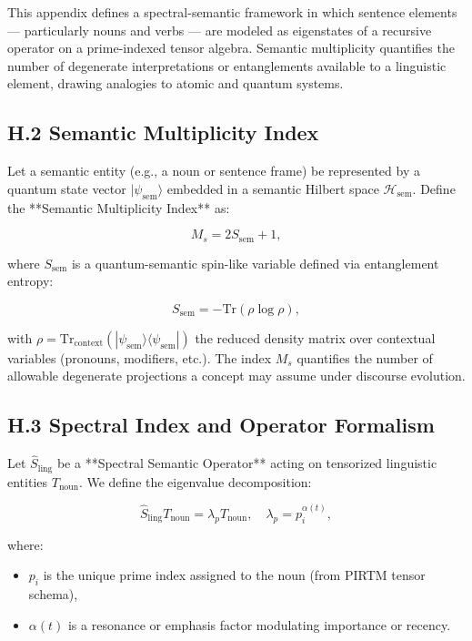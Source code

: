 \documentclass[12pt]{article}
\begin{document}
\begin{itemize}
This appendix defines a spectral-semantic framework in which sentence elements — particularly nouns and verbs — are modeled as eigenstates of a recursive operator on a prime-indexed tensor algebra. Semantic multiplicity quantifies the number of degenerate interpretations or entanglements available to a linguistic element, drawing analogies to atomic and quantum systems.

\subsection*{H.2 Semantic Multiplicity Index}

Let a semantic entity (e.g., a noun or sentence frame) be represented by a quantum state vector \( |\psi_{\text{sem}}\rangle \) embedded in a semantic Hilbert space \( \mathcal{H}_{\text{sem}} \). Define the **Semantic Multiplicity Index** as:

\[
M_s = 2S_{\text{sem}} + 1,
\]

where \( S_{\text{sem}} \) is a quantum-semantic spin-like variable defined via entanglement entropy:

\[
S_{\text{sem}} = -\text{Tr}(\rho \log \rho),
\]

with \( \rho = \text{Tr}_{\text{context}}(|\psi_{\text{sem}}\rangle \langle \psi_{\text{sem}}|) \) the reduced density matrix over contextual variables (pronouns, modifiers, etc.). The index \( M_s \) quantifies the number of allowable degenerate projections a concept may assume under discourse evolution.

\subsection*{H.3 Spectral Index and Operator Formalism}

Let \( \hat{S}_{\text{ling}} \) be a **Spectral Semantic Operator** acting on tensorized linguistic entities \( T_{\text{noun}} \). We define the eigenvalue decomposition:

\[
\hat{S}_{\text{ling}} T_{\text{noun}} = \lambda_p T_{\text{noun}},
\quad
\lambda_p = p_i^{\alpha(t)},
\]

where:
\begin{itemize}
    \item \( p_i \) is the unique prime index assigned to the noun (from PIRTM tensor schema),
    \item \( \alpha(t) \) is a resonance or emphasis factor modulating importance or recency.
\end{itemize}


\end{itemize}
\end{document}
